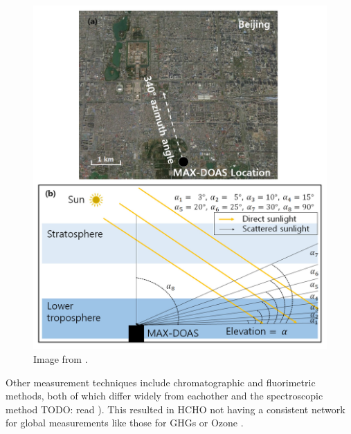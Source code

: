     \begin{figure}
      \includegraphics{Figures/MAXDoasExample.png}
      \caption{ %
        Image from \citet{Lee2015}.
      }
      \label{ch_LitRev:fig:MAXDOASExample}
    \end{figure}
    
    Other measurement techniques include chromatographic and fluorimetric methods, both of which differ widely from eachother and the spectroscopic method TODO: read \citep{Hak2005}).
    This resulted in HCHO not having a consistent network for global measurements like those for GHGs or Ozone \citep{FortemsCheiney2012}.
    
